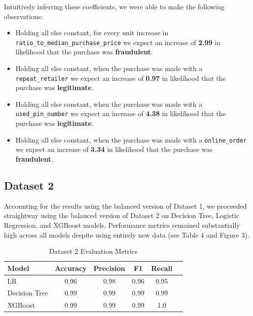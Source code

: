 \documentclass{article}
\begin{document}
Intuitively inferring these coefficients, we were able to make the following observations: 

\begin{itemize}
  \item Holding all else constant, for every unit increase in \texttt{ratio\_to\_median\_purchase\_price} we expect an increase of \textbf{2.99} in likelihood that the purchase was \textbf{fraudulent}.
  \item Holding all else constant, when the purchase was made with a \texttt{repeat\_retailer} we expect an increase of \textbf{0.97} in likelihood that the purchase was \textbf{legitimate}.
  \item Holding all else constant, when the purchase was made with a \texttt{used\_pin\_number} we expect an increase of \textbf{4.38} in likelihood that the purchase was \textbf{legitimate}.
  \item Holding all else constant, when the purchase was made with a \texttt{online\_order} we expect an increase of \textbf{3.34} in likelihood that the purchase was \textbf{fraudulent}.
\end{itemize}

\subsection{Dataset 2}

Accounting for the results using the balanced version of Dataset 1, we proceeded straightway using the balanced version of Dataset 2 on Decision Tree, Logistic Regression, and XGBoost models. Performance metrics remained substantially high across all models despite using entirely new data (see Table 4 and Figure 3).

\begin{table}[ht]
\centering

\label{tab:card_trans_metrics}
\begin{tabular}{lccccc}
\toprule
Model & Accuracy & Precision & F1 & Recall\\
\midrule
LR & 0.96 & 0.98 & 0.96 & 0.95\\
Decision Tree & 0.99& 0.99& 0.99& 0.99\\
XGBoost & 0.99& 0.99& 0.99& 1.0\\
\bottomrule
\end{tabular}
\caption{Dataset 2 Evaluation Metrics}
\end{table}
\end{document}
